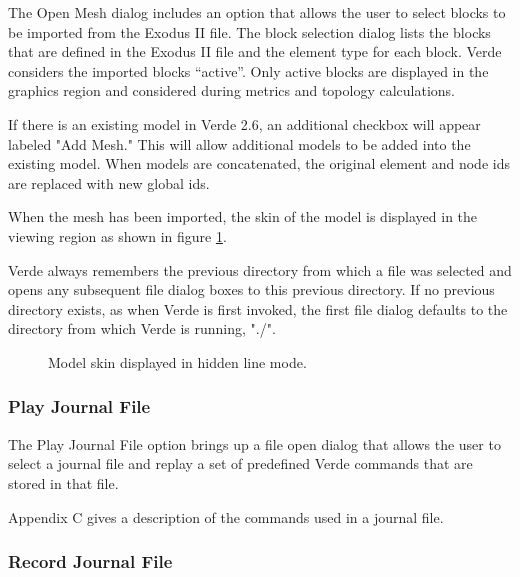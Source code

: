 \documentclass[10pt]{report}
\begin{document}
The Open Mesh dialog includes an option that allows the user to select 
blocks to be imported from the Exodus II file. The block 
selection dialog lists the blocks that are defined in the Exodus II file 
and the element type for each block. Verde considers the imported 
blocks ``active''.  Only active blocks are displayed in the graphics 
region and considered during metrics and topology calculations.

If there is an existing model in Verde 2.6, an additional checkbox
will appear labeled "Add Mesh."  This will allow additional models to
be added into the existing model.  When models are concatenated, the
original element and node ids are replaced with new global ids.

When the mesh has been imported, the skin of the model is displayed in 
the viewing region as shown in figure \ref{fig:model_screen}.

Verde always remembers the previous directory from which a file was 
selected and opens any subsequent file dialog boxes to this previous directory. 
If no previous directory exists, as when Verde is first invoked, the first file 
dialog defaults to the directory from which Verde is running, "./". 

\htmlrule
\begin{figure}[tbh]
  \begin{center}
              {}
    \caption{Model skin displayed in hidden line mode.}
    \label{fig:model_screen}
  \end{center}
\end{figure}     



\subsubsection{Play Journal File}
\label{play_journal}

The Play Journal File option brings up a file open dialog that allows 
the user to select a journal file and replay a set of predefined Verde 
commands that are stored in that file.  

Appendix C gives a description of the commands used in a journal file.

\subsubsection{Record Journal File}
\label{record_journal}
\end{document}
